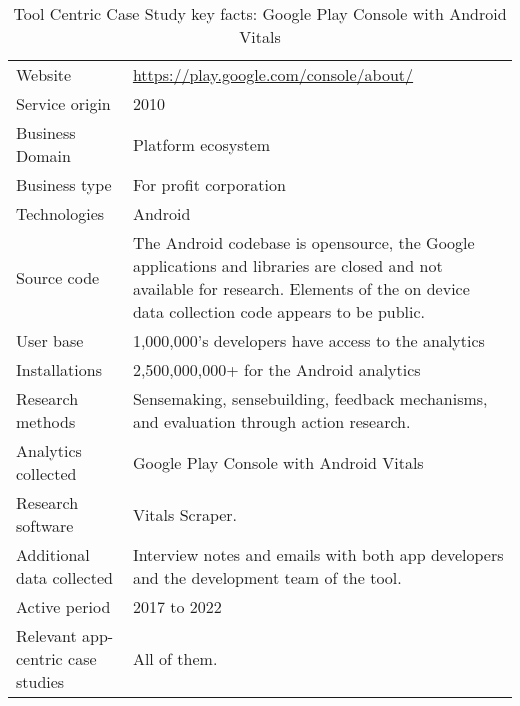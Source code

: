 {\renewcommand{\arraystretch}{0.8}%
\begin{table}[htbp!]
    \centering
    \small
    \setlength{\tabcolsep}{6pt}
    \begin{tabular}{lp{9cm}}
       \toprule
       Website &\url{https://play.google.com/console/about/} \\
       Service origin & 2010\footnotemark \\
       Business Domain & Platform ecosystem \\
       Business type & For profit corporation \\
       Technologies  & Android \\
       Source code  & The Android codebase is opensource, the Google applications and libraries are closed and not available for research. Elements of the on device data collection code appears to be public.\\
       \midrule
       User base & 1,000,000's developers have access to the analytics \\
       Installations & 2,500,000,000+ for the Android analytics~\citep{androiddevelopersblog2019_unlock_your_creativity_2_5_billion} \\ 
       \midrule
       Research methods &Sensemaking, sensebuilding, feedback mechanisms, and evaluation through action research. \\
       Analytics collected &Google Play Console with Android Vitals \\
       Research software & Vitals Scraper. \\
       Additional data collected &Interview notes and emails with both app developers and the development team of the tool. \\
       Active period & 2017 to 2022 \\
       Relevant app-centric case studies & All of them. \\
       \bottomrule
    \end{tabular}
    \caption{Tool Centric Case Study key facts: Google Play Console with Android Vitals}
    \label{tab:google_play_console_with_android_vitals_anaytics_overview}
\end{table}
}



